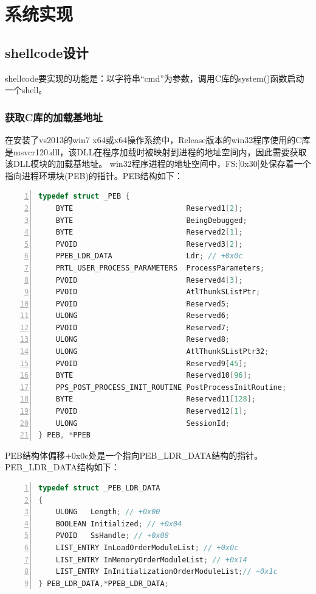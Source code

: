 \documentclass[bachelor]{thesis-uestc}
\begin{document}
\chapter{系统实现}
\section{shellcode设计}
shellcode要实现的功能是：以字符串``cmd''为参数，调用C库的system()函数启动一个shell。

\subsection{获取C库的加载基地址}
在安装了vs2013的win7 x64或x64操作系统中，Release版本的win32程序使用的C库是msvcr120.dll，该DLL在程序加载时被映射到进程的地址空间内，因此需要获取该DLL模块的加载基地址。
win32程序进程的地址空间中，FS:[0x30]处保存着一个指向进程环境块(PEB)的指针。PEB结构如下：

\begin{lstlisting}[language=C++, basicstyle=\ttfamily\tiny, numbers=left, numberstyle=\tiny, keywordstyle=\color{blue!70}, commentstyle=\color{red!50!green!50!blue!50}, frame=shadowbox, rulesepcolor=\color{red!20!green!20!blue!20}]
typedef struct _PEB {
	BYTE                          Reserved1[2];
	BYTE                          BeingDebugged;
	BYTE                          Reserved2[1];
	PVOID                         Reserved3[2];
	PPEB_LDR_DATA                 Ldr; // +0x0c 
	PRTL_USER_PROCESS_PARAMETERS  ProcessParameters;
	PVOID                         Reserved4[3];
	PVOID                         AtlThunkSListPtr;
	PVOID                         Reserved5;
	ULONG                         Reserved6;
	PVOID                         Reserved7;
	ULONG                         Reserved8;
	ULONG                         AtlThunkSListPtr32;
	PVOID                         Reserved9[45];
	BYTE                          Reserved10[96];
	PPS_POST_PROCESS_INIT_ROUTINE PostProcessInitRoutine;
	BYTE                          Reserved11[128];
	PVOID                         Reserved12[1];
	ULONG                         SessionId;
} PEB, *PPEB
\end{lstlisting}

PEB结构体偏移+0x0c处是一个指向PEB\_LDR\_DATA结构的指针。PEB\_LDR\_DATA结构如下：

\begin{lstlisting}[language=C++, basicstyle=\ttfamily\tiny, numbers=left, numberstyle=\tiny, keywordstyle=\color{blue!70}, commentstyle=\color{red!50!green!50!blue!50}, frame=shadowbox, rulesepcolor=\color{red!20!green!20!blue!20}]
typedef struct _PEB_LDR_DATA
{
	ULONG	Length; // +0x00
	BOOLEAN	Initialized; // +0x04
	PVOID	SsHandle; // +0x08
	LIST_ENTRY InLoadOrderModuleList; // +0x0c
	LIST_ENTRY InMemoryOrderModuleList; // +0x14
	LIST_ENTRY InInitializationOrderModuleList;// +0x1c
} PEB_LDR_DATA,*PPEB_LDR_DATA;
\end{lstlisting}
\end{document}
